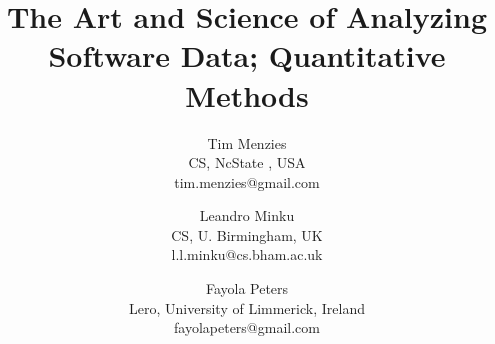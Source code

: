 \documentclass[conference]{IEEEtran}
\begin{document}
%
\title{The Art and Science of Analyzing Software Data; Quantitative Methods}




% 
\author{%
Tim Menzies\\
CS, NcState , USA\\
tim.menzies@gmail.com
\and
 Leandro Minku\\
CS,  U.  Birmingham, UK\\
l.l.minku@cs.bham.ac.uk
\and
Fayola Peters\\
Lero, University of Limmerick, Ireland\\
fayolapeters@gmail.com
}








\maketitle
\end{document}
